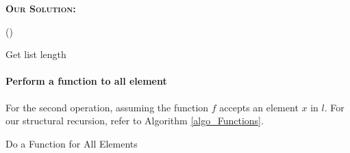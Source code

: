 \documentclass{exam}
\renewenvironment{solution}{\textsc{\textbf{Our Solution:}} \par}{}
\begin{document}
\begin{questions}
\begin{parts}
\begin{solution}
				



		
\begin{algorithm}
	

	\BlankLine

	\Begin(\getLength){

	\caption{Get list length}
	\label{algo_Length}
	}

\end{algorithm}

			\paragraph{Perform a function to all element} For the second operation, assuming the function $f$ accepts an element $x$ in $l$. For our structural recursion, refer to Algorithm \ref{algo_Functions}.
			
			\begin{algorithm}
				\caption{Do a Function for All Elements}
				\label{algo_Functions}
				\


\end{algorithm}
\end{solution}
\end{parts}
\end{questions}
\end{document}
